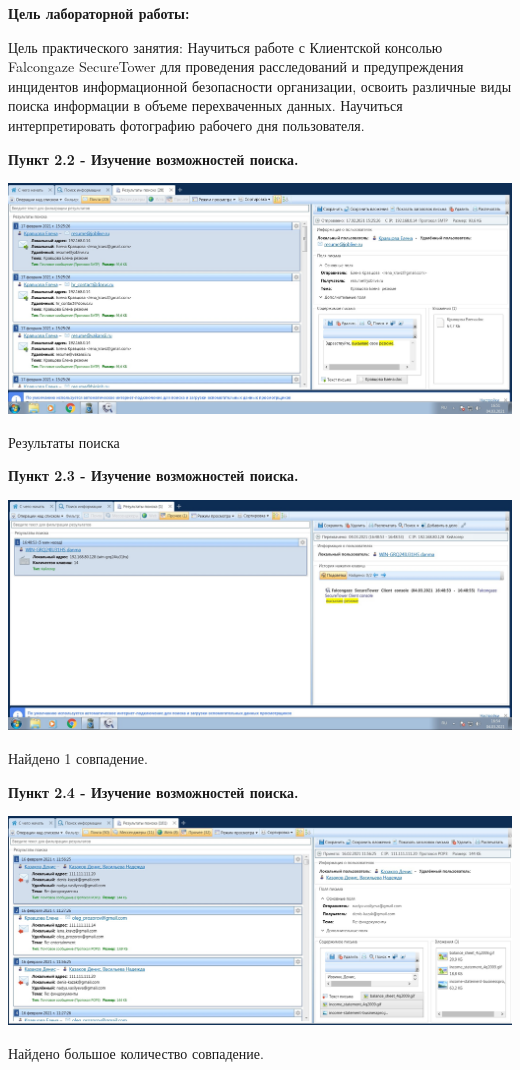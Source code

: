 \documentclass[a4paper,14pt]{extarticle}
\begin{document}
    \textbf{Цель лабораторной работы:}

    Цель практического занятия: Научиться работе с Клиентской консолью
    Falcongaze SecureTower для проведения расследований и предупреждения инцидентов
    информационной безопасности организации, освоить различные виды поиска информации
    в объеме перехваченных данных. Научиться интерпретировать фотографию рабочего дня
    пользователя.

    \textbf{Пункт 2.2 - Изучение возможностей поиска.}
    \begin{center}
        \includegraphics[scale=0.25]{pics/2.2.jpg}

        Результаты поиска
    \end{center}

    \textbf{Пункт 2.3 - Изучение возможностей поиска.}
    \begin{center}
        \includegraphics[scale=0.25]{pics/2.3.jpg}
        
        Найдено 1 совпадение.
    \end{center}

    \newpage
    \textbf{Пункт 2.4 - Изучение возможностей поиска.}
    \begin{center}
        \includegraphics[scale=0.25]{pics/2.4.jpg}

        Найдено большое количество совпадение.
    \end{center}
\end{document}
